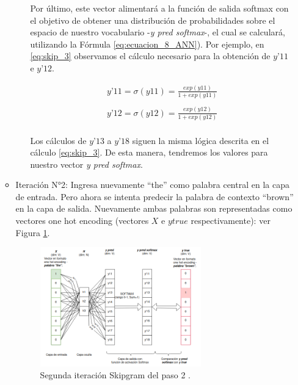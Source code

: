 \documentclass[12pt,a4paper]{article}
\begin{document}
\begin{sloppypar}
\begin{enumerate}
\begin{itemize}
\begin{itemize}
Por último, este vector alimentará a la función de salida softmax con el objetivo de obtener una distribución de probabilidades sobre el espacio de nuestro vocabulario -\textit{y pred softmax}-, el cual se  calculará, utilizando la Fórmula \ref{eq:ecuacion_8_ANN}). Por ejemplo, en \ref{eq:skip_3} observamos el cálculo necesario para la obtención de $y’11$ e $y’12$.

\begin{equation}\label{eq:skip_3}
\begin{gathered}
y’11 = \sigma(y11) = \frac{exp(y11)}{1 + exp(y11)} \\ \\
y’12 = \sigma(y12) = \frac{exp(y12)}{1 + exp(y12)}
\end{gathered}
\end{equation}
\\
Los cálculos de $y’13$ a $y’18$ siguen la misma lógica descrita en el cálculo \ref{eq:skip_3}. De esta manera, tendremos los valores para nuestro vector \textit{y pred softmax}. 

\end{itemize}

\item Iteración N°2: Ingresa nuevamente “the” como palabra central en la capa de entrada. Pero ahora se intenta predecir la palabra de contexto “brown” en la capa de salida. Nuevamente ambas palabras son representadas como vectores one hot encoding (vectores $X$ e $y true$ respectivamente): ver Figura \ref{fig:7_EjSkip}. 
\begin{figure}[H]    %
\centering
\includegraphics[width=0.7\textwidth]{images/Ejemplo_Skipgram/7_EjSkip.png}
\caption{Segunda iteración Skipgram del paso 2 .} 
\label{fig:7_EjSkip}
\end{figure}


\end{itemize}
\end{enumerate}
\end{sloppypar}
\end{document}
